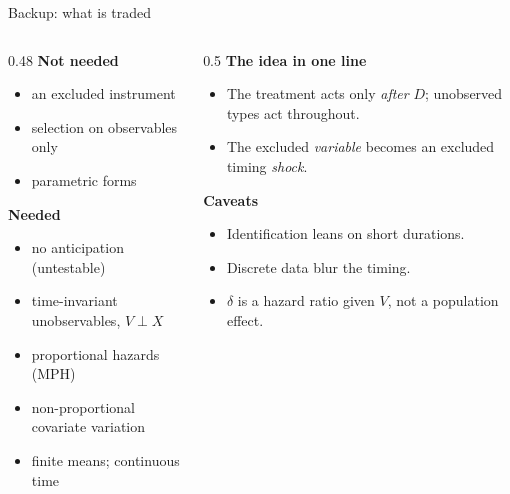 \documentclass[aspectratio=169,10pt]{beamer}
\begin{document}
\begin{frame}{Backup: what is traded}
  \begin{columns}[T]
    \begin{column}{0.48\textwidth}
      \textbf{Not needed}
      \begin{itemize}
        \item an excluded instrument
        \item selection on observables only
        \item parametric forms
      \end{itemize}
      \medskip
      \textbf{Needed}
      \begin{itemize}
        \item no anticipation (untestable)
        \item time-invariant unobservables, $V\perp X$
        \item proportional hazards (MPH)
        \item non-proportional covariate variation
        \item finite means; continuous time
      \end{itemize}
    \end{column}
    \begin{column}{0.5\textwidth}
      \textbf{The idea in one line}
      \begin{itemize}
        \item The treatment acts only \emph{after} $D$; unobserved types act throughout.
        \item The excluded \emph{variable} becomes an excluded timing \emph{shock}.
      \end{itemize}
      \medskip
      \textbf{Caveats}
      \begin{itemize}
        \item Identification leans on short durations.
        \item Discrete data blur the timing.
        \item $\delta$ is a hazard ratio given $V$, not a population effect.
      \end{itemize}
    \end{column}
  \end{columns}
\end{frame}
\end{document}
